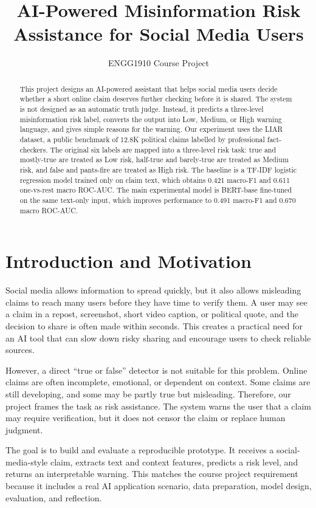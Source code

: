 \documentclass[10pt]{article}
\title{AI-Powered Misinformation Risk Assistance for Social Media Users}
\author{ENGG1910 Course Project}
\date{}
\begin{document}
\maketitle

\begin{abstract}
This project designs an AI-powered assistant that helps social media users decide whether a short online claim deserves further checking before it is shared. The system is not designed as an automatic truth judge. Instead, it predicts a three-level misinformation risk label, converts the output into Low, Medium, or High warning language, and gives simple reasons for the warning. Our experiment uses the LIAR dataset, a public benchmark of 12.8K political claims labelled by professional fact-checkers. The original six labels are mapped into a three-level risk task: true and mostly-true are treated as Low risk, half-true and barely-true are treated as Medium risk, and false and pants-fire are treated as High risk. The baseline is a TF-IDF logistic regression model trained only on claim text, which obtains 0.421 macro-F1 and 0.611 one-vs-rest macro ROC-AUC. The main experimental model is BERT-base fine-tuned on the same text-only input, which improves performance to 0.491 macro-F1 and 0.670 macro ROC-AUC.
\end{abstract}

\section{Introduction and Motivation}
Social media allows information to spread quickly, but it also allows misleading claims to reach many users before they have time to verify them. A user may see a claim in a repost, screenshot, short video caption, or political quote, and the decision to share is often made within seconds. This creates a practical need for an AI tool that can slow down risky sharing and encourage users to check reliable sources.

However, a direct ``true or false'' detector is not suitable for this problem. Online claims are often incomplete, emotional, or dependent on context. Some claims are still developing, and some may be partly true but misleading. Therefore, our project frames the task as risk assistance. The system warns the user that a claim may require verification, but it does not censor the claim or replace human judgment.

The goal is to build and evaluate a reproducible prototype. It receives a social-media-style claim, extracts text and context features, predicts a risk level, and returns an interpretable warning. This matches the course project requirement because it includes a real AI application scenario, data preparation, model design, evaluation, and reflection.
\end{document}
